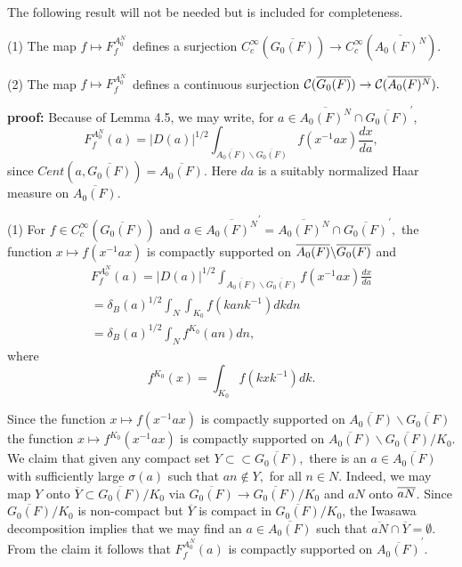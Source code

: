 The following result will not be needed but is included for completeness.

\begin{lemma}
(1) The map $f\longmapsto F_f^{A_0^N}$\ defines a surjection $C_c^\infty (%
\overline{G_0(F)})\rightarrow C_c^\infty (\overline{A_0(F)^N}).$

(2) The map $f\longmapsto F_f^{A_0^N}$\ defines a continuous surjection $%
{\cal C}(\overline{G_0(F)})\rightarrow {\cal C}(\overline{A_0(F)^N}).$
\end{lemma}

{\bf proof:} Because of Lemma 4.5, we may write, for $a\in \overline{A_0(F)^N%
}\cap \overline{G_0(F)}^{\prime }$, 
\begin{equation}
F_f^{A_0^N}(a)=|D(a)|^{1/2}\int_{\overline{A_0(F)}\backslash \overline{G_0(F)%
}}f(x^{-1}ax)\frac{dx}{da},
\end{equation}
since $Cent(a,\overline{G_0(F)})=\overline{A_0(F)}$. Here $da$ is a suitably
normalized Haar measure on $\overline{A_0(F)}$.

(1) For $f\in C_c^\infty (\overline{G_0(F)})$ and $a\in \overline{A_0(F)^N}%
^{\prime }=\overline{A_0(F)^N}\cap \overline{G_0(F)}^{\prime },$ the
function $x\longmapsto f(x^{-1}ax)$ is compactly supported on $\overline{%
A_0(F)}\backslash \overline{G_0(F)}$ and 
\[
\begin{array}{c}
F_f^{A_0^N}(a)=|D(a)|^{1/2}\int_{\overline{A_0(F)}\backslash \overline{G_0(F)%
}}f(x^{-1}ax)\frac{dx}{da} \\ 
=\delta _B(a)^{1/2}\int_N\int_{K_0}f(kank^{-1})dkdn \\ 
=\delta _B(a)^{1/2}\int_Nf^{K_0}(an)dn,
\end{array}
\]
where 
\begin{equation}
f^{K_0}(x)=\int_{K_0}f(kxk^{-1})dk.
\end{equation}

Since the function $x\longmapsto f(x^{-1}ax)$ is compactly supported on $%
\overline{A_0(F)}\backslash \overline{G_0(F)}$ the function $x\longmapsto
f^{K_0}(x^{-1}ax)$ is compactly supported on $\overline{A_0(F)}\backslash 
\overline{G_0(F)}/K_0.$ We claim that given any compact set $Y\subset
\subset \overline{G_0(F)},$ there is an $a\in \overline{A_0(F)}$ with
sufficiently large $\sigma (a)$ such that $an\notin Y,$ for all $n\in N.$
Indeed, we may map $Y$ onto $\overline{Y}\subset \overline{G_0(F)}/K_0$ via $%
\overline{G_0(F)}\rightarrow \overline{G_0(F)}/K_0$ and $aN$ onto $\overline{%
aN}$. Since $\overline{G_0(F)}/K_0$ is non-compact but $\overline{Y}$ is
compact in $\overline{G_0(F)}/K_0$, the Iwasawa decomposition implies that
we may find an $a\in \overline{A_0(F)}$ such that $\overline{aN}\cap 
\overline{Y}=\emptyset $. From the claim it follows that $F_f^{A_0^N}(a)$ is
compactly supported on $\overline{A_0(F)}^{\prime }.$

